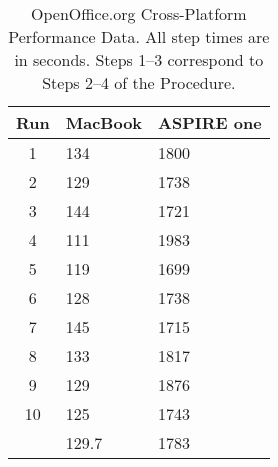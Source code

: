 \begin{table}
  \begin{center}
  \begin{tabular}{| c | l | l |}
    \hline
    Run  & MacBook & ASPIRE one \\ \hline
    1    & 134     & 1800       \\ \hline
    2    & 129     & 1738       \\ \hline
    3    & 144     & 1721       \\ \hline
    4    & 111     & 1983       \\ \hline
    5    & 119     & 1699       \\ \hline
    6    & 128     & 1738       \\ \hline
    7    & 145     & 1715       \\ \hline
    8    & 133     & 1817       \\ \hline
    9    & 129     & 1876       \\ \hline
    10   & 125     & 1743       \\ \hline
         & 129.7   & 1783       \\
    \hline
  \end{tabular}
  \caption{OpenOffice.org Cross-Platform Performance Data.  All step times are in seconds.  Steps 1--3 correspond to Steps 2--4 of the Procedure.}
  \label{ooCp}
  \end{center}
\end{table}
